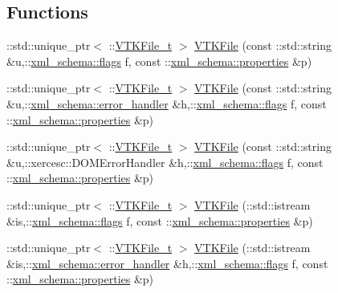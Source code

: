 \subsection*{Functions}
\begin{DoxyCompactItemize}
\item 
\+::std\+::unique\+\_\+ptr$<$ \+::\hyperlink{classVTKFile__t}{V\+T\+K\+File\+\_\+t} $>$ \hyperlink{vtk-unstructured_8cpp_a53e5a643323b19b93ad61791fc3211e4}{V\+T\+K\+File} (const \+::std\+::string \&u,\+::\hyperlink{namespacexml__schema_a0612287d030cb2732d31a45b258fdc87}{xml\+\_\+schema\+::flags} f, const \+::\hyperlink{namespacexml__schema_a1a8ebac679580b41baebd62c7d641c1d}{xml\+\_\+schema\+::properties} \&p)
\item 
\+::std\+::unique\+\_\+ptr$<$ \+::\hyperlink{classVTKFile__t}{V\+T\+K\+File\+\_\+t} $>$ \hyperlink{vtk-unstructured_8cpp_aafb21bb7e4b24eaca2f23c17eae1c4ac}{V\+T\+K\+File} (const \+::std\+::string \&u,\+::\hyperlink{namespacexml__schema_a0a5d9528e9175cedf199984a8bb64d62}{xml\+\_\+schema\+::error\+\_\+handler} \&h,\+::\hyperlink{namespacexml__schema_a0612287d030cb2732d31a45b258fdc87}{xml\+\_\+schema\+::flags} f, const \+::\hyperlink{namespacexml__schema_a1a8ebac679580b41baebd62c7d641c1d}{xml\+\_\+schema\+::properties} \&p)
\item 
\+::std\+::unique\+\_\+ptr$<$ \+::\hyperlink{classVTKFile__t}{V\+T\+K\+File\+\_\+t} $>$ \hyperlink{vtk-unstructured_8cpp_a0245d6a373d7792e5bfcba0b04995d88}{V\+T\+K\+File} (const \+::std\+::string \&u,\+::xercesc\+::\+D\+O\+M\+Error\+Handler \&h,\+::\hyperlink{namespacexml__schema_a0612287d030cb2732d31a45b258fdc87}{xml\+\_\+schema\+::flags} f, const \+::\hyperlink{namespacexml__schema_a1a8ebac679580b41baebd62c7d641c1d}{xml\+\_\+schema\+::properties} \&p)
\item 
\+::std\+::unique\+\_\+ptr$<$ \+::\hyperlink{classVTKFile__t}{V\+T\+K\+File\+\_\+t} $>$ \hyperlink{vtk-unstructured_8cpp_ad6708dd1d3370c80f0cd9a2e5e01b872}{V\+T\+K\+File} (\+::std\+::istream \&is,\+::\hyperlink{namespacexml__schema_a0612287d030cb2732d31a45b258fdc87}{xml\+\_\+schema\+::flags} f, const \+::\hyperlink{namespacexml__schema_a1a8ebac679580b41baebd62c7d641c1d}{xml\+\_\+schema\+::properties} \&p)
\item 
\+::std\+::unique\+\_\+ptr$<$ \+::\hyperlink{classVTKFile__t}{V\+T\+K\+File\+\_\+t} $>$ \hyperlink{vtk-unstructured_8cpp_af37b2f35560b60f7570030b38d92e4ac}{V\+T\+K\+File} (\+::std\+::istream \&is,\+::\hyperlink{namespacexml__schema_a0a5d9528e9175cedf199984a8bb64d62}{xml\+\_\+schema\+::error\+\_\+handler} \&h,\+::\hyperlink{namespacexml__schema_a0612287d030cb2732d31a45b258fdc87}{xml\+\_\+schema\+::flags} f, const \+::\hyperlink{namespacexml__schema_a1a8ebac679580b41baebd62c7d641c1d}{xml\+\_\+schema\+::properties} \&p)

\end{DoxyCompactItemize}
